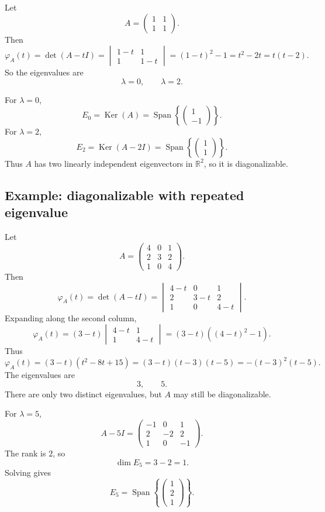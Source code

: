 \documentclass[11pt]{article}
\newcommand{\R}{\mathbb R}
\newcommand{\Span}{\operatorname{Span}}
\newcommand{\Ker}{\operatorname{Ker}}
\theoremstyle{definition}
\theoremstyle{plain}
\begin{document}
Let
\[
A=\begin{pmatrix}1&1\\1&1\end{pmatrix}.
\]
Then
\[
\varphi_A(t)=\det(A-tI)
=\begin{vmatrix}1-t&1\\1&1-t\end{vmatrix}
=(1-t)^2-1
=t^2-2t
=t(t-2).
\]
So the eigenvalues are
\[
\lambda=0,
\qquad
\lambda=2.
\]

For $\lambda=0$,
\[
E_0=\Ker(A)=\Span\left\{\begin{pmatrix}1\\-1\end{pmatrix}\right\}.
\]
For $\lambda=2$,
\[
E_2=\Ker(A-2I)=\Span\left\{\begin{pmatrix}1\\1\end{pmatrix}\right\}.
\]
Thus $A$ has two linearly independent eigenvectors in $\R^2$, so it is diagonalizable.

\subsection{Example: diagonalizable with repeated eigenvalue}

Let
\[
A=\begin{pmatrix}
4&0&1\\
2&3&2\\
1&0&4
\end{pmatrix}.
\]
Then
\[
\varphi_A(t)=\det(A-tI)
=\begin{vmatrix}
4-t&0&1\\
2&3-t&2\\
1&0&4-t
\end{vmatrix}.
\]
Expanding along the second column,
\[
\varphi_A(t)
=(3-t)\begin{vmatrix}4-t&1\\1&4-t\end{vmatrix}
=(3-t)((4-t)^2-1).
\]
Thus
\[
\varphi_A(t)=(3-t)(t^2-8t+15)
=(3-t)(t-3)(t-5)
=-(t-3)^2(t-5).
\]
The eigenvalues are
\[
3,
\qquad
5.
\]
There are only two distinct eigenvalues, but $A$ may still be diagonalizable.

For $\lambda=5$,
\[
A-5I=
\begin{pmatrix}
-1&0&1\\
2&-2&2\\
1&0&-1
\end{pmatrix}.
\]
The rank is $2$, so
\[
\dim E_5=3-2=1.
\]
Solving gives
\[
E_5=\Span\left\{
\begin{pmatrix}1\\2\\1\end{pmatrix}
\right\}.
\]
\end{document}
